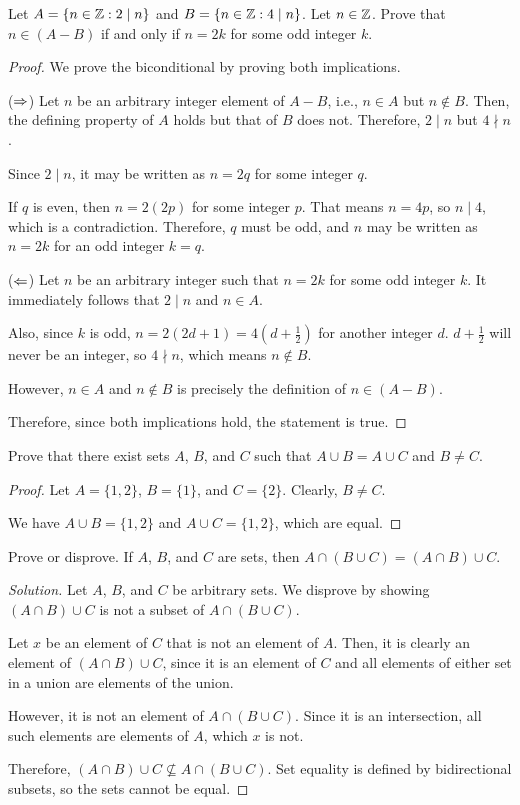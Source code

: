 \begin{recommended}
  Let $A=\{n\in\mathbb{Z} : 2\mid n\}$ and $B=\{n\in\mathbb{Z} : 4\mid n\}$.
  Let $n \in \mathbb{Z}$. Prove that $n \in (A-B)$ if and only if $n=2k$ for some odd integer $k$.
\end{recommended}
\begin{proof}
  We prove the biconditional by proving both implications.

  ($\Rightarrow$) Let $n$ be an arbitrary integer element of $A-B$, i.e., $n\in A$ but $n\not\in B$.
  Then, the defining property of $A$ holds but that of $B$ does not.
  Therefore, $2 \mid n$ but $4 \nmid n$.

  Since $2 \mid n$, it may be written as $n=2q$ for some integer $q$.

  If $q$ is even, then $n=2(2p)$ for some integer $p$.
  That means $n=4p$, so $n \mid 4$, which is a contradiction.
  Therefore, $q$ must be odd, and $n$ may be written as $n=2k$ for an odd integer $k=q$.

  ($\Leftarrow$) Let $n$ be an arbitrary integer such that $n=2k$ for some odd integer $k$.
  It immediately follows that $2 \mid n$ and $n \in A$.

  Also, since $k$ is odd, $n=2(2d+1)=4\left(d+\frac12\right)$ for another integer $d$.
  $d+\frac12$ will never be an integer, so $4 \nmid n$, which means $n \not\in B$.

  However, $n \in A$ and $n \not\in B$ is precisely the definition of $n \in (A-B)$.

  Therefore, since both implications hold, the statement is true.
\end{proof}


\begin{recommended}
  Prove that there exist sets $A$, $B$, and $C$ such that $A \cup B=A \cup C$ and $B \neq C$.
\end{recommended}
\begin{proof}
  Let $A=\{1,2\}$, $B=\{1\}$, and $C=\{2\}$.
  Clearly, $B \neq C$.

  We have $A \cup B = \{1,2\}$ and $A \cup C = \{1,2\}$, which are equal.
\end{proof}


\begin{recommended}
  Prove or disprove.
  If $A$, $B$, and $C$ are sets, then $A \cap (B \cup C) = (A \cap B) \cup C$.
\end{recommended}
\begin{proof}[Solution]
  Let $A$, $B$, and $C$ be arbitrary sets.
  We disprove by showing $(A \cap B) \cup C$ is not a subset of $A \cap (B \cup C)$.

  Let $x$ be an element of $C$ that is not an element of $A$.
  Then, it is clearly an element of $(A \cap B) \cup C$, since it is an element of $C$ and all elements of either set in a union are elements of the union.

  However, it is not an element of $A \cap (B \cup C)$.
  Since it is an intersection, all such elements are elements of $A$, which $x$ is not.

  Therefore, $(A \cap B) \cup C \not\subseteq A \cap (B \cup C)$.
  Set equality is defined by bidirectional subsets, so the sets cannot be equal.
\end{proof}


